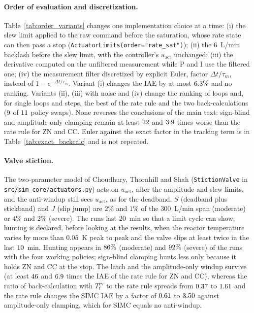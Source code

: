 \documentclass[11pt]{article}
\begin{document}
\paragraph{Order of evaluation and discretization.} Table~\ref{tab:order_variants} changes one implementation choice at a time: (i) the slew limit applied to the raw command before the saturation, whose rate state can then pass a stop (\texttt{ActuatorLimits(order="rate\_sat")}); (ii) the $6$~L/min backlash before the slew limit, with the controller's $u_{\text{act}}$ unchanged; (iii) the derivative computed on the unfiltered measurement while P and I use the filtered one; (iv) the measurement filter discretized by explicit Euler, factor $\Delta t/\tau_m$, instead of $1 - e^{-\Delta t/\tau_m}$. Variant (i) changes the IAE by at most $6.3\%$ and no ranking. Variants (ii), (iii) with noise and (iv) change the ranking of loops and, for single loops and steps, the best of the rate rule and the two back-calculations ($9$ of $11$ policy swaps). None reverses the conclusions of the main text: sign-blind and amplitude-only clamping remain at least $22$ and $3.9$ times worse than the rate rule for ZN and CC. Euler against the exact factor in the tracking term is in Table~\ref{tab:exact_backcalc} and is not repeated.



\paragraph{Valve stiction.} The two-parameter model of Choudhury, Thornhill and Shah \cite{choudhury2005modelling} (\texttt{StictionValve} in \texttt{src/sim\_core/actuators.py}) acts on $u_{\text{act}}$, after the amplitude and slew limits, and the anti-windup still sees $u_{\text{act}}$, as for the deadband. $S$ (deadband plus stickband) and $J$ (slip jump) are $2\%$ and $1\%$ of the $300$~L/min span (moderate) or $4\%$ and $2\%$ (severe). The runs last $20$~min so that a limit cycle can show; hunting is declared, before looking at the results, when the reactor temperature varies by more than $0.05$~K peak to peak and the valve slips at least twice in the last $10$~min. Hunting appears in $86\%$ (moderate) and $92\%$ (severe) of the runs with the four working policies; sign-blind clamping hunts less only because it holds ZN and CC at the stop. The latch and the amplitude-only windup survive (at least $46$ and $6.9$ times the IAE of the rate rule for ZN and CC), whereas the ratio of back-calculation with $T_t^{\mathrm{cv}}$ to the rate rule spreads from $0.37$ to $1.61$ and the rate rule changes the SIMC IAE by a factor of $0.61$ to $3.50$ against amplitude-only clamping, which for SIMC equals no anti-windup.
\end{document}
